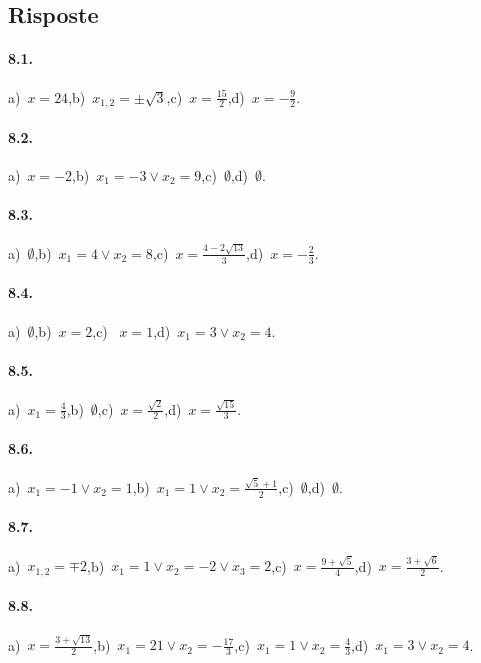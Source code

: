 \subsection{Risposte}
\begin{multicols}{2}
\paragraph{8.1.} a)~$x=24$,\quad b)~$x_{1,2}=\pm \sqrt 3$,\quad c)~$x=\frac{15} 2$,\quad d)~$x=-\frac 9 2$.

\paragraph{8.2.} a)~$x=-2$,\quad b)~$x_1=-3\vee x_2=9$,\quad c)~$\emptyset $,\quad d)~$\emptyset$.

\paragraph{8.3.} a)~$\emptyset$,\quad b)~$x_1=4\vee x_2=8$,\quad c)~$x=\frac{4-2\sqrt{13}} 3$,\quad d)~$x=-\frac 2 3$.

\paragraph{8.4.} a)~$\emptyset$,\quad b)~$x=2$,\quad c)~ $x=1$,\quad d)~$x_1=3\vee x_2=4$.

\paragraph{8.5.} a)~$x_1=\frac 4 3$,\quad b)~$\emptyset$,\quad c)~$x=\frac{\sqrt 2} 2$,\quad d)~$x=\frac{\sqrt{15}} 3$.

\paragraph{8.6.} a)~$x_1=-1\vee x_2=1$,\quad b)~$x_1=1\vee x_2=\frac{\sqrt 5+1} 2$,\quad c)~$\emptyset$,\quad d)~$\emptyset$.

\paragraph{8.7.} a)~$x_{1,2}=\mp 2$,\quad b)~$x_1=1\vee x_2=-2\vee x_3=2$,\quad c)~$x=\frac{9+\sqrt 5} 4$,\quad d)~$x=\frac{3+\sqrt 6} 2$.

\paragraph{8.8.} a)~$x=\frac{3+\sqrt{13}} 2$,\quad b)~$x_1=21\vee x_2=-\frac{17} 3$,\quad c)~$x_1=1\vee x_2=\frac 4 3$,\quad d)~$x_1=3\vee x_2=4$.


\end{multicols}

